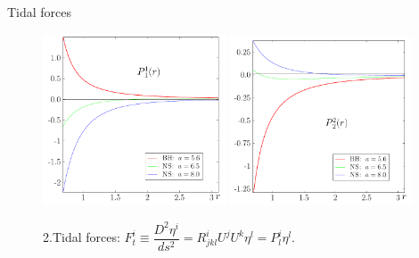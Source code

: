 \documentclass[12pt,aspectratio=139, slidestop,notes=hide]{beamer}
\begin{document}
\begin{frame}
{\centerline {Tidal forces\quad}}

\begin{figure}[]
\begin{center}
\includegraphics [width=0.483\textwidth]{Figure3}
\includegraphics [width=0.483\textwidth]{Figure4}
\end{center}\vspace{-1ex}
\caption{2.\;Tidal forces: $F_t^{i}\equiv\dfrac{D^2\eta^{i}}{ds^2}= R^{i}_{jkl} U^{j}U^{k}\eta^{l} = P^{i}_{l}\eta^{l}$.}
\label{fig1}
\end{figure}

\end{frame}
\end{document}

